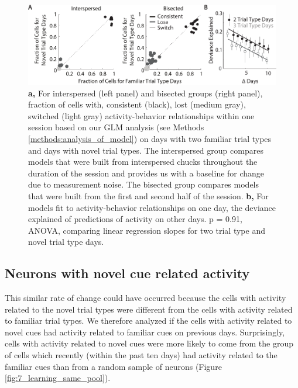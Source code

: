 \begin{figure}
\includegraphics[width=\textwidth]{figures/7_rate.pdf}
\caption[]{\textbf{a,} For interspersed (left panel) and bisected groups (right panel), fraction of cells with, consistent (black), lost (medium gray), switched (light gray) activity-behavior relationships within one session based on our GLM analysis (see Methods \ref{methods:analysis_of_model}) on days with two familiar trial types and days with novel trial types. The interspersed group compares models that were built from interspersed chucks throughout the duration of the session and provides us with a baseline for change due to measurement noise. The bisected group compares models that were built from the first and second half of the session.
%
\textbf{b,} For models fit to activity-behavior relationships on one day, the deviance explained of predictions of activity on other days. p = 0.91, ANOVA, comparing linear regression slopes for two trial type and novel trial type days.
\label{fig:7_rate}}
\end{figure}

\subsection{Neurons with novel cue related activity} \label{chap4:novel_cue_pool}

This similar rate of change could have occurred because the cells with activity related to the novel trial types were different from the cells with activity related to familiar trial types. We therefore analyzed if the cells with activity related to novel cues had activity related to familiar cues on previous days. Surprisingly, cells with activity related to novel cues were more likely to come from the group of cells which recently (within the past ten days) had activity related to the familiar cues than from a random sample of neurons (Figure \ref{fig:7_learning_same_pool}). 

